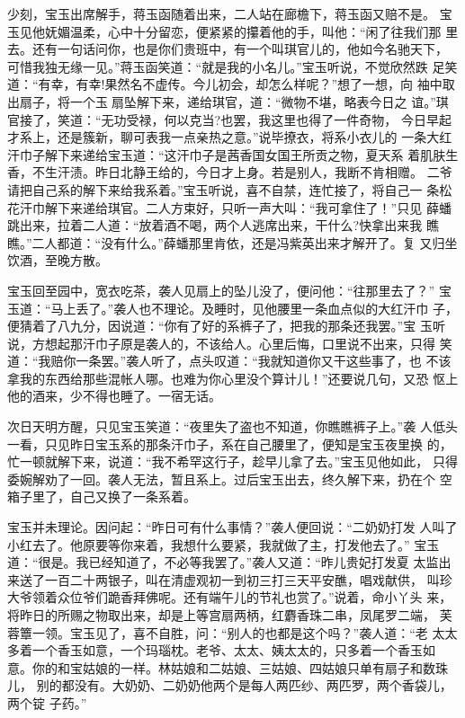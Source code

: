 少刻，宝玉出席解手，蒋玉函随着出来，二人站在廊檐下，蒋玉函又赔不是。
宝玉见他妩媚温柔，心中十分留恋，便紧紧的攥着他的手，叫他：“闲了往我们那
里去。还有一句话问你，也是你们贵班中，有一个叫琪官儿的，他如今名驰天下，
可惜我独无缘一见。”蒋玉函笑道：“就是我的小名儿。”宝玉听说，不觉欣然跌
足笑道：“有幸，有幸!果然名不虚传。今儿初会，却怎么样呢？”想了一想，向
袖中取出扇子，将一个玉扇坠解下来，递给琪官，道：“微物不堪，略表今日之
谊。”琪官接了，笑道：“无功受禄，何以克当?也罢，我这里也得了一件奇物，
今日早起才系上，还是簇新，聊可表我一点亲热之意。”说毕撩衣，将系小衣儿的
一条大红汗巾子解下来递给宝玉道：“这汗巾子是茜香国女国王所贡之物，夏天系
着肌肤生香，不生汗渍。昨日北静王给的，今日才上身。若是别人，我断不肯相赠。
二爷请把自己系的解下来给我系着。”宝玉听说，喜不自禁，连忙接了，将自己一
条松花汗巾解下来递给琪官。二人方束好，只听一声大叫：“我可拿住了！”只见
薛蟠跳出来，拉着二人道：“放着酒不喝，两个人逃席出来，干什么?快拿出来我
瞧瞧。”二人都道：“没有什么。”薛蟠那里肯依，还是冯紫英出来才解开了。复
又归坐饮酒，至晚方散。

宝玉回至园中，宽衣吃茶，袭人见扇上的坠儿没了，便问他：“往那里去了？”
宝玉道：“马上丢了。”袭人也不理论。及睡时，见他腰里一条血点似的大红汗巾
子，便猜着了八九分，因说道：“你有了好的系裤子了，把我的那条还我罢。”宝
玉听说，方想起那汗巾子原是袭人的，不该给人。心里后悔，口里说不出来，只得
笑道：“我赔你一条罢。”袭人听了，点头叹道：“我就知道你又干这些事了，也
不该拿我的东西给那些混帐人哪。也难为你心里没个算计儿！”还要说几句，又恐
怄上他的酒来，少不得也睡了。一宿无话。

次日天明方醒，只见宝玉笑道：“夜里失了盗也不知道，你瞧瞧裤子上。”袭
人低头一看，只见昨日宝玉系的那条汗巾子，系在自己腰里了，便知是宝玉夜里换
的，忙一顿就解下来，说道：“我不希罕这行子，趁早儿拿了去。”宝玉见他如此，
只得委婉解劝了一回。袭人无法，暂且系上。过后宝玉出去，终久解下来，扔在个
空箱子里了，自己又换了一条系着。

宝玉并未理论。因问起：“昨日可有什么事情？”袭人便回说：“二奶奶打发
人叫了小红去了。他原要等你来着，我想什么要紧，我就做了主，打发他去了。”
宝玉道：“很是。我已经知道了，不必等我罢了。”袭人又道：“昨儿贵妃打发夏
太监出来送了一百二十两银子，叫在清虚观初一到初三打三天平安醮，唱戏献供，
叫珍大爷领着众位爷们跪香拜佛呢。还有端午儿的节礼也赏了。”说着，命小丫头
来，将昨日的所赐之物取出来，却是上等宫扇两柄，红麝香珠二串，凤尾罗二端，
芙蓉簟一领。宝玉见了，喜不自胜，问：“别人的也都是这个吗？”袭人道：“老
太太多着一个香玉如意，一个玛瑙枕。老爷、太太、姨太太的，只多着一个香玉如
意。你的和宝姑娘的一样。林姑娘和二姑娘、三姑娘、四姑娘只单有扇子和数珠儿，
别的都没有。大奶奶、二奶奶他两个是每人两匹纱、两匹罗，两个香袋儿，两个锭
子药。”

